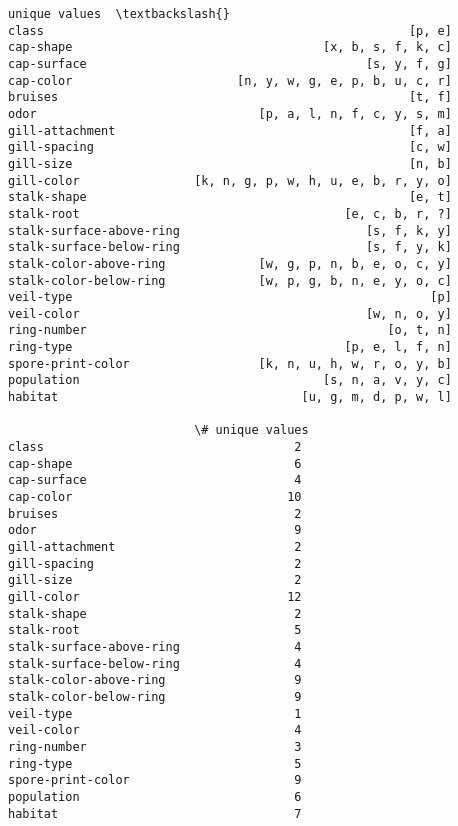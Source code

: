 \documentclass[11pt]{article}
\makeatletter
\newcommand{\boxspacing}{\kern\kvtcb@left@rule\kern\kvtcb@boxsep}
\newcommand{\prompt}[4]{
        {\ttfamily\llap{{\color{#2}[#3]:\hspace{3pt}#4}}\vspace{-\baselineskip}}
    }
\makeatother
\begin{document}
            \begin{tcolorbox}[breakable, size=fbox, boxrule=.5pt, pad at break*=1mm, opacityfill=0]
\prompt{Out}{outcolor}{89}{\boxspacing}
\begin{Verbatim}[commandchars=\\\{\}]
                                                 unique values  \textbackslash{}
class                                                   [p, e]
cap-shape                                   [x, b, s, f, k, c]
cap-surface                                       [s, y, f, g]
cap-color                       [n, y, w, g, e, p, b, u, c, r]
bruises                                                 [t, f]
odor                               [p, a, l, n, f, c, y, s, m]
gill-attachment                                         [f, a]
gill-spacing                                            [c, w]
gill-size                                               [n, b]
gill-color                [k, n, g, p, w, h, u, e, b, r, y, o]
stalk-shape                                             [e, t]
stalk-root                                     [e, c, b, r, ?]
stalk-surface-above-ring                          [s, f, k, y]
stalk-surface-below-ring                          [s, f, y, k]
stalk-color-above-ring             [w, g, p, n, b, e, o, c, y]
stalk-color-below-ring             [w, p, g, b, n, e, y, o, c]
veil-type                                                  [p]
veil-color                                        [w, n, o, y]
ring-number                                          [o, t, n]
ring-type                                      [p, e, l, f, n]
spore-print-color                  [k, n, u, h, w, r, o, y, b]
population                                  [s, n, a, v, y, c]
habitat                                  [u, g, m, d, p, w, l]

                          \# unique values
class                                   2
cap-shape                               6
cap-surface                             4
cap-color                              10
bruises                                 2
odor                                    9
gill-attachment                         2
gill-spacing                            2
gill-size                               2
gill-color                             12
stalk-shape                             2
stalk-root                              5
stalk-surface-above-ring                4
stalk-surface-below-ring                4
stalk-color-above-ring                  9
stalk-color-below-ring                  9
veil-type                               1
veil-color                              4
ring-number                             3
ring-type                               5
spore-print-color                       9
population                              6
habitat                                 7
\end{Verbatim}
\end{tcolorbox}
        
\end{document}
